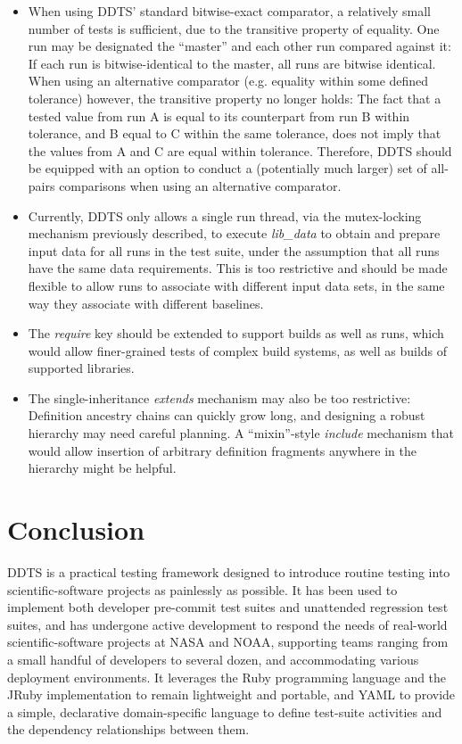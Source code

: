 \documentclass[conference]{IEEEtran}
\begin{document}
\begin{itemize}
\item When using DDTS' standard bitwise-exact comparator, a relatively small number of tests is sufficient, due to the transitive property of equality. One run may be designated the ``master'' and each other run compared against it: If each run is bitwise-identical to the master, all runs are bitwise identical. When using an alternative comparator (e.g. equality within some defined tolerance) however, the transitive property no longer holds: The fact that a tested value from run A is equal to its counterpart from run B within tolerance, and B equal to C within the same tolerance, does not imply that the values from A and C are equal within tolerance. Therefore, DDTS should be equipped with an option to conduct a (potentially much larger) set of all-pairs comparisons when using an alternative comparator.
\item Currently, DDTS only allows a single run thread, via the mutex-locking mechanism previously described, to execute \emph{lib\_data} to obtain and prepare input data for all runs in the test suite, under the assumption that all runs have the same data requirements. This is too restrictive and should be made flexible to allow runs to associate with different input data sets, in the same way they associate with different baselines.
\item The \emph{require} key should be extended to support builds as well as runs, which would allow finer-grained tests of complex build systems, as well as builds of supported libraries.
\item The single-inheritance \emph{extends} mechanism may also be too restrictive: Definition ancestry chains can quickly grow long, and designing a robust hierarchy may need careful planning. A ``mixin''-style \emph{include} mechanism that would allow insertion of arbitrary definition fragments anywhere in the hierarchy might be helpful.
\end{itemize}

\section{Conclusion}

DDTS is a practical testing framework designed to introduce routine testing into scientific-software projects as painlessly as possible. It has been used to implement both developer pre-commit test suites and unattended regression test suites, and has undergone active development to respond the needs of real-world scientific-software projects at NASA and NOAA, supporting teams ranging from a small handful of developers to several dozen, and accommodating various deployment environments. It leverages the Ruby programming language and the JRuby implementation to remain lightweight and portable, and YAML to provide a simple, declarative domain-specific language to define test-suite activities and the dependency relationships between them.
\end{document}
